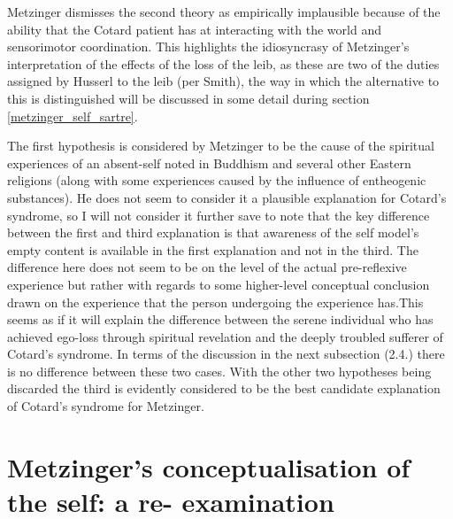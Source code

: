 Metzinger dismisses the second theory as empirically implausible because of the ability that the Cotard patient has at interacting with the world and sensorimotor coordination. This highlights the idiosyncrasy of Metzinger's interpretation of the effects of the loss of the leib, as these are two of the duties assigned by Husserl to the leib (per Smith), the way in which the alternative to this is distinguished will be discussed in some detail during section \ref{metzinger_self_sartre}.

The first hypothesis is considered by Metzinger to be the cause of the spiritual experiences of an absent-self noted in Buddhism and several other Eastern religions (along with some experiences caused by the influence of entheogenic substances). He does not seem to consider it a plausible explanation for Cotard's syndrome, so I will not consider it further save to note that the key difference between the first and third explanation is that awareness of the self model's empty content is available in the first explanation and not in the third. The difference here does not seem to be on the level of the actual pre-reflexive experience but rather with regards to some higher-level conceptual conclusion drawn on the experience that the person undergoing the experience has.This seems as if it will explain the difference between the serene individual who has achieved ego-loss through spiritual revelation and the deeply troubled sufferer of Cotard's syndrome. In terms of the discussion in the next subsection (2.4.) there is no difference between these two cases.
With the other two hypotheses being discarded the third is evidently considered to be the best candidate explanation of Cotard's syndrome for Metzinger.

\section{Metzinger's conceptualisation of the self: a re- examination}
\label{metzinger_self}

